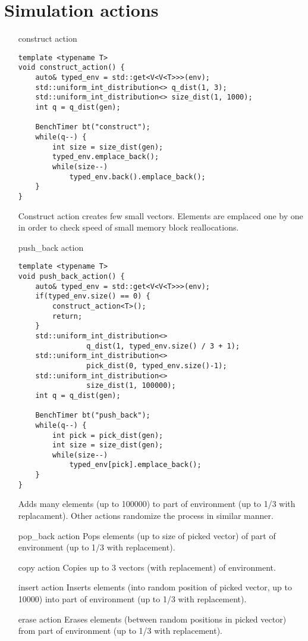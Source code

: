 \documentclass[inz, english, shortabstract]{iithesis}
\begin{document}
\section{Simulation actions}
\begin{itemize}
\item [construct action]
\begin{lstlisting}[caption=construct action]
template <typename T>
void construct_action() {
	auto& typed_env = std::get<V<V<T>>>(env);
	std::uniform_int_distribution<> q_dist(1, 3);
	std::uniform_int_distribution<> size_dist(1, 1000);
	int q = q_dist(gen);
	
	BenchTimer bt("construct");
	while(q--) {
		int size = size_dist(gen);
		typed_env.emplace_back();
		while(size--)
			typed_env.back().emplace_back();
	}
}
\end{lstlisting}
Construct action creates few small vectors. Elements are emplaced one by one in order to check speed of small memory block reallocations. 

\item [push\_back action]
\begin{lstlisting}[caption=push\_back action]
template <typename T>
void push_back_action() {
	auto& typed_env = std::get<V<V<T>>>(env);
	if(typed_env.size() == 0) {
		construct_action<T>();
		return;
	}
	std::uniform_int_distribution<> 
				q_dist(1, typed_env.size() / 3 + 1);
	std::uniform_int_distribution<> 
				pick_dist(0, typed_env.size()-1);
	std::uniform_int_distribution<> 
				size_dist(1, 100000);
	int q = q_dist(gen);
	
	BenchTimer bt("push_back");
	while(q--) {
		int pick = pick_dist(gen);
		int size = size_dist(gen);
		while(size--)
			typed_env[pick].emplace_back();
	}
}
\end{lstlisting}
Adds many elements (up to 100000) to part of environment (up to 1/3 with replacament). Other actions randomize the process in similar manner.

\item [pop\_back action]
Pops elements (up to size of picked vector) of part of environment (up to 1/3 with replacement). 

\item [copy action]
Copies up to 3 vectors (with replacement) of environment.

\item[insert action]
Inserts elements (into random position of picked vector, up to 10000) into part of environment (up to 1/3 with replacement).

\item[erase action]
Erases elements (between random positions in picked vector) from part of environment (up to 1/3 with replacement).
\end{itemize}
\end{document}
